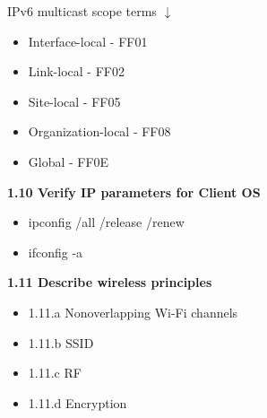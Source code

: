 \documentclass{article}
\begin{document}
IPv6 multicast scope terms $\downarrow$
\begin{itemize}
\item Interface-local - FF01
\item Link-local - FF02
\item Site-local - FF05
\item Organization-local - FF08
\item Global - FF0E
\end{itemize}

\textbf{1.10 Verify IP parameters for Client OS}
\begin{itemize}
\item ipconfig /all /release /renew
\item ifconfig -a
\end{itemize}
 
\textbf{1.11 Describe wireless principles}
\begin{itemize}
\item 1.11.a Nonoverlapping Wi-Fi channels
\item 1.11.b SSID
\item 1.11.c RF
\item 1.11.d Encryption
\end{itemize}
  
\end{document}
